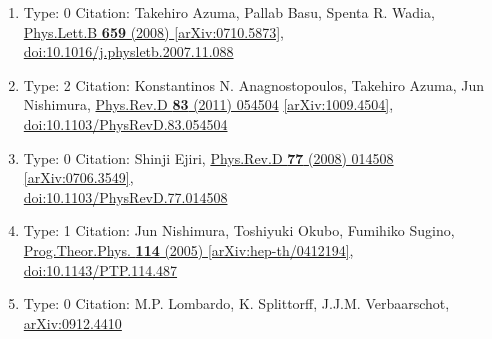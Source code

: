 \documentclass[a4paper,10pt]{article}
\begin{document}
\begin{enumerate}
\begin{enumerate}
  \item Type: 0 Citation: Takehiro Azuma, Pallab Basu, Spenta R. Wadia, \href{https://www.doi.org/10.1016/j.physletb.2007.11.088}{Phys.Lett.B {\bf 659} (2008) }  \href{https://arxiv.org/abs/0710.5873}{[arXiv:0710.5873]},\\\href{https://www.doi.org/10.1016/j.physletb.2007.11.088}{doi:10.1016/j.physletb.2007.11.088}
  \item Type: 2 Citation: Konstantinos N. Anagnostopoulos, Takehiro Azuma, Jun Nishimura, \href{https://www.doi.org/10.1103/PhysRevD.83.054504}{Phys.Rev.D {\bf 83} (2011) 054504}  \href{https://arxiv.org/abs/1009.4504}{[arXiv:1009.4504]},\\\href{https://www.doi.org/10.1103/PhysRevD.83.054504}{doi:10.1103/PhysRevD.83.054504}
  \item Type: 0 Citation: Shinji Ejiri, \href{https://www.doi.org/10.1103/PhysRevD.77.014508}{Phys.Rev.D {\bf 77} (2008) 014508}  \href{https://arxiv.org/abs/0706.3549}{[arXiv:0706.3549]},\\\href{https://www.doi.org/10.1103/PhysRevD.77.014508}{doi:10.1103/PhysRevD.77.014508}
  \item Type: 1 Citation: Jun Nishimura, Toshiyuki Okubo, Fumihiko Sugino, \href{https://www.doi.org/10.1143/PTP.114.487}{Prog.Theor.Phys. {\bf 114} (2005) }  \href{https://arxiv.org/abs/hep-th/0412194}{[arXiv:hep-th/0412194]},\\\href{https://www.doi.org/10.1143/PTP.114.487}{doi:10.1143/PTP.114.487}
  \item Type: 0 Citation: M.P. Lombardo, K. Splittorff, J.J.M. Verbaarschot, \href{https://arxiv.org/abs/0912.4410}{arXiv:0912.4410}

\end{enumerate}
\end{enumerate}
\end{document}
